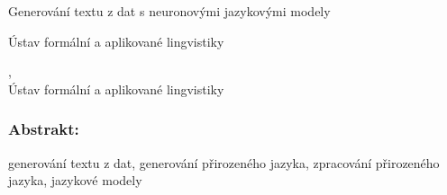 \documentclass[12pt,notitlepage,a4paper,openright]{report}
\begin{document}
\cleardoublepage{}
\begin{description}[leftmargin=7.5em,labelwidth=7em,labelindent=0em,labelsep=0.5em]
  \item[Název práce:] Generování textu z dat s neuronovými jazykovými modely
  \item[Autor:] \theauthor{}
  \item[Katedra:] Ústav formální a aplikované lingvistiky
  \item[Vedoucí práce:] \thesupervisor,\\ Ústav formální a aplikované lingvistiky
\end{description}

\subsubsection{Abstrakt:}



\begin{description}[leftmargin=7.5em,labelwidth=7em,labelindent=0em,labelsep=0.5em]
  \item[Klíčová slova:] generování textu z dat, generování přirozeného jazyka, zpracování přirozeného jazyka, jazykové modely
\end{description}





\cleardoublepage{}
\ \vspace{10mm}

\end{document}
